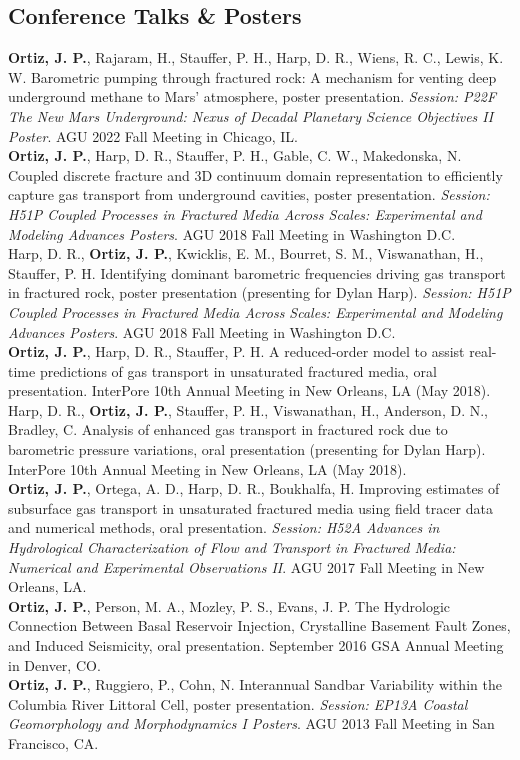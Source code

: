 \documentclass[11pt, letterpaper]{article}
\newcommand{\years}[1]{\marginnote{\scriptsize #1}}
\begin{document}
\subsection*{Conference Talks \& Posters}
\years{2022}\textbf{Ortiz, J. P.}, Rajaram, H., Stauffer, P. H., Harp, D. R.,
Wiens, R. C., Lewis, K. W. Barometric pumping through fractured rock: A
mechanism for venting deep underground methane to Mars' atmosphere, poster
presentation. \textit{Session: P22F The New Mars Underground: Nexus of Decadal
Planetary Science Objectives II Poster}. AGU 2022 Fall Meeting in Chicago, IL.\\ 
\years{2018}\textbf{Ortiz, J. P.}, Harp, D. R., Stauffer, P. H., Gable, C. W.,
Makedonska, N. Coupled discrete fracture and 3D continuum domain representation
to efficiently capture gas transport from underground cavities, poster
presentation. \textit{Session: H51P Coupled Processes in Fractured Media Across
Scales: Experimental and Modeling Advances Posters}. AGU 2018 Fall Meeting in
Washington D.C.\\
\years{2018}Harp, D. R., \textbf{Ortiz, J. P.}, Kwicklis, E. M., Bourret, S.
M., Viswanathan, H., Stauffer, P. H. Identifying dominant barometric
frequencies driving gas transport in fractured rock, poster presentation
(presenting for Dylan Harp). \textit{Session: H51P Coupled Processes in
Fractured Media Across Scales: Experimental and Modeling Advances Posters}. AGU
2018 Fall Meeting in Washington D.C.\\
\years{2018}\textbf{Ortiz, J. P.}, Harp, D. R., Stauffer, P. H. A reduced-order
model to assist real-time predictions of gas transport in unsaturated fractured
media, oral presentation. InterPore 10th Annual Meeting in New Orleans, LA (May
2018).\\
\years{2018}Harp, D. R., \textbf{Ortiz, J. P.}, Stauffer, P. H., Viswanathan,
H., Anderson, D. N., Bradley, C. Analysis of enhanced gas transport in
fractured rock due to barometric pressure variations, oral presentation
(presenting for Dylan Harp). InterPore 10th Annual Meeting in New Orleans, LA
(May 2018).\\
\years{2017}\textbf{Ortiz, J. P.}, Ortega, A. D., Harp, D. R., Boukhalfa, H.
Improving estimates of subsurface gas transport in unsaturated fractured media
using field tracer data and numerical methods, oral presentation.
\textit{Session: H52A Advances in Hydrological Characterization of Flow and
Transport in Fractured Media: Numerical and Experimental Observations II}. AGU
2017 Fall Meeting in New Orleans, LA.\\
\years{2016}\textbf{Ortiz, J. P.}, Person, M. A., Mozley, P. S., Evans, J. P.
The Hydrologic Connection Between Basal Reservoir Injection, Crystalline
Basement Fault Zones, and Induced Seismicity, oral presentation. September 2016
GSA Annual Meeting in Denver, CO.\\
\years{2013}\textbf{Ortiz, J. P.}, Ruggiero, P., Cohn, N. Interannual Sandbar
Variability within the Columbia River Littoral Cell, poster presentation.
\textit{Session: EP13A Coastal Geomorphology and Morphodynamics I Posters}.
AGU 2013 Fall Meeting in San Francisco, CA.
\end{document}
